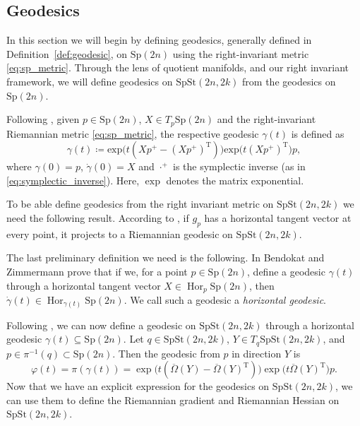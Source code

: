 \subsection{Geodesics}
In this section we will begin by defining geodesics, generally defined in Definition~\ref{def:geodesic}, on $\mathrm{Sp}(2n)$ using the right-invariant metric \eqref{eq:sp_metric}. Through the lens of quotient manifolds, and our right invariant framework, we will define geodesics on $\mathrm{SpSt}(2n, 2k)$ from the geodesics on $\mathrm{Sp}(2n)$.

Following \cite[Prop.~2.1]{BendokatZimmermann2021}, given $p\in \mathrm{Sp}(2n)$,  $X\in T_{p}\mathrm{Sp}(2n)$ and the right-invariant Riemannian metric \eqref{eq:sp_metric}, the respective geodesic $\gamma(t)$ is defined as
\begin{equation*}
    \gamma(t)\coloneqq \mathrm{exp}\big(t(Xp^{+}-(Xp^{+}) ^{\mathrm{T}})\big)\mathrm{exp}\big(t(Xp^{+})^{\mathrm{T}}\big)p,
\end{equation*}
where $\gamma(0)=p$, $\dot{\gamma}(0)=X$ and $\cdot^{+}$ is the symplectic inverse (as in \eqref{eq:symplectic_inverse}). Here, $\operatorname{\exp}$ denotes the matrix exponential. 

To be able define geodesics from the right invariant metric on $\mathrm{SpSt}(2n, 2k)$ we need the following result. According to \cite[Cor.~7.46]{ONeill1983}, if $g_{p}$ has a horizontal tangent vector at every point, it projects to a Riemannian geodesic on $\mathrm{SpSt}(2n, 2k)$. 

The last preliminary definition we need is the following. In \cite[Lem.~3.11]{BendokatZimmermann2021} Bendokat and Zimmermann prove that if we, for a point $p \in \mathrm{Sp}(2n)$, define a geodesic $\gamma(t)$ through a horizontal tangent vector $X\in \operatorname{Hor}_{p}\mathrm{Sp}(2n)$, then $\dot{\gamma}(t)\in \operatorname{Hor}_{\gamma(t)}\mathrm{Sp}(2n)$. We call such a geodesic a \textit{horizontal geodesic}.

Following \cite[Prop.~3.12]{BendokatZimmermann2021}, we can now define a geodesic on $\mathrm{SpSt}(2n, 2k)$ through a horizontal geodesic $\gamma(t)\subseteq\mathrm{Sp}(2n)$. Let $q\in \mathrm{SpSt}(2n, 2k)$, $Y\in T_{q}\mathrm{SpSt}(2n, 2k)$, and $p\in \pi^{-1}(q)\subset \mathrm{Sp}(2n)$. Then the geodesic from $p$ in direction $Y$ is
%
\begin{equation}\label{eq:geodesic_spst}
\varphi(t)=\pi(\gamma(t))=\exp\big(t(\overline{\Omega}(Y)-\overline{\Omega}(Y)^{\mathrm{T}})\big)\exp\big(t \overline{\Omega}(Y)^{\mathrm{T}}\big)p.
\end{equation}
%
Now that we have an explicit expression for the geodesics on $\mathrm{SpSt}(2n, 2k)$, we can use them to define the Riemannian gradient and Riemannian Hessian on $\mathrm{SpSt}(2n, 2k)$.
